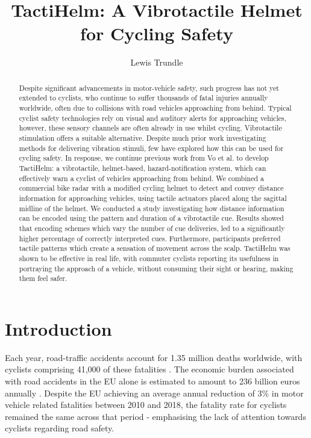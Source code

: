 \documentclass{mpaper}
\begin{document}
\title{TactiHelm: A Vibrotactile Helmet for Cycling Safety}
\author{Lewis Trundle}

\maketitle

\begin{abstract}
Despite significant advancements in motor-vehicle safety, such progress has not yet extended to cyclists, who continue to suffer thousands of fatal injuries annually worldwide, often due to collisions with road vehicles approaching from behind. Typical cyclist safety technologies rely on visual and auditory alerts for approaching vehicles, however, these sensory channels are often already in use whilst cycling. Vibrotactile stimulation offers a suitable alternative. Despite much prior work investigating methods for delivering vibration stimuli, few have explored how this can be used for cycling safety. In response, we continue previous work from Vo et al. \cite{10.1145/3411763.3451580} to develop TactiHelm: a vibrotactile, helmet-based, hazard-notification system, which can effectively warn a cyclist of vehicles approaching from behind. We combined a commercial bike radar with a modified cycling helmet to detect and convey distance information for approaching vehicles, using tactile actuators placed along the sagittal midline of the helmet. We conducted a study investigating how distance information can be encoded using the pattern and duration of a vibrotactile cue. Results showed that encoding schemes which vary the number of cue deliveries, led to a significantly higher percentage of correctly interpreted cues. Furthermore, participants preferred tactile patterns which create a sensation of movement across the scalp. TactiHelm was shown to be effective in real life, with commuter cyclists reporting its usefulness in portraying the approach of a vehicle, without consuming their sight or hearing, making them feel safer.
\end{abstract}

\section{Introduction}
Each year, road-traffic accidents account for 1.35 million deaths worldwide, with cyclists comprising 41,000 of these fatalities \cite{world2018global}. The economic burden associated with road accidents in the EU alone is estimated to amount to 236 billion euros annually \cite{costoftransport}. Despite the EU achieving an average annual reduction of 3\% in motor vehicle related fatalities between 2010 and 2018, the fatality rate for cyclists remained the same across that period \cite{adminaite2020safe} - emphasising the lack of attention towards cyclists regarding road safety.
\end{document}

